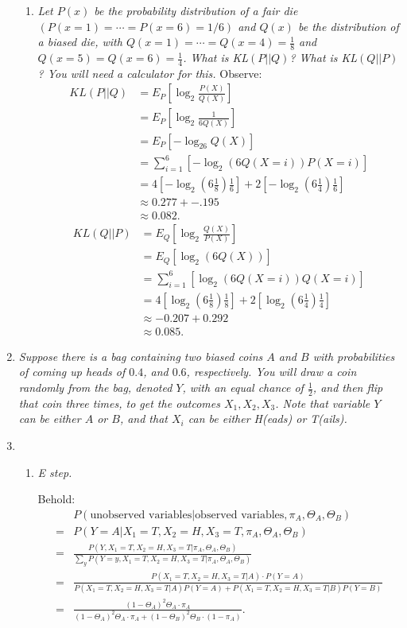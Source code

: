 \documentclass[12pt,oneside,reqno]{amsart}
\theoremstyle{plain}
\theoremstyle{definition}
\theoremstyle{remark}
\newcommand{\bb}{\vspace{3mm}}
\newcommand{\bee}{\begin{equation}\begin{aligned}}
\newcommand{\eee}{\end{aligned}\end{equation}}
\newcommand{\fracc}{\frac}
\begin{document}
\begin{enumerate}[label=\arabic*.]
\begin{enumerate}
\item \textit{Let $P(x)$ be the probability distribution of a fair die $(P(x = 1)=\cdots =P(x = 6) = 1/6)$ and $Q(x)$ be the distribution of a biased die, with $Q(x = 1) = \cdots = Q(x = 4) = \fracc{1}{8}$ and $Q(x = 5) = Q(x = 6) = \fracc{1}{4}$. What is KL$(P||Q)$? What is KL$(Q||P)$? You will need a calculator for this. }
Observe:
\bee
KL(P||Q) &= E_P\left[\log_2\fracc{P(X)}{Q(X)} \right]\\
&= E_P\left[\log_2\fracc{1}{6Q(X)} \right]\\
&= E_P\left[-\log_26Q(X) \right]\\
&= \sum_{i = 1}^6\left[-\log_2(6Q(X = i))P(X = i) \right]\\
&= 4\left[-\log_2(6\fracc{1}{8})\fracc{1}{6} \right] + 2\left[-\log_2(6\fracc{1}{4})\fracc{1}{6} \right]\\
&\approx 0.277 + -.195\\
&\approx 0.082.
\eee
\bee
KL(Q||P) &= E_Q\left[\log_2\fracc{Q(X)}{P(X)} \right]\\
&= E_Q\left[\log_2(6Q(X)) \right]\\
&= \sum_{i = 1}^6\left[\log_2(6Q(X = i))Q(X = i) \right]\\
&= 4\left[\log_2(6\fracc{1}{8})\fracc{1}{8} \right] + 2\left[\log_2(6\fracc{1}{4})\fracc{1}{4} \right]\\
&\approx -0.207 + 0.292\\
&\approx 0.085.
\eee

\end{enumerate}
\bb
\item \textit{Suppose there is a bag containing two biased coins $A$ and $B$ with probabilities of coming up heads of $0.4$, and $0.6$, respectively. You will draw a coin randomly from the bag, denoted $Y$, with an equal chance of $\fracc{1}{2}$, and then flip that coin three times, to get the outcomes $X_1,X_2,X_3$. Note that variable $Y$ can be either $A$ or $B$, and that $X_i$ can be either H(eads) or T(ails). }


\vspace{200mm}

\item 

\begin{enumerate}

\item \textit{E step. }

Behold:
\bee
&P(\text{unobserved variables}|\text{observed variables},\pi_A,\Theta_A,\Theta_B)\\
=& P(Y=A|X_1 = T,X_2 = H,X_3 = T,\pi_A,\Theta_A,\Theta_B)\\
=& \frac{P(Y,X_1 = T,X_2 = H,X_3 = T|\pi_A,\Theta_A,\Theta_B)}{\sum_yP(Y = y,X_1 = T,X_2 = H,X_3 = T|\pi_A,\Theta_A,\Theta_B)}\\
=& \frac{P(X_1 = T,X_2 = H,X_3 = T|A)\cdot P(Y = A)}{P(X_1 = T,X_2 = H,X_3 = T|A)P(Y = A) + P(X_1 = T,X_2 = H,X_3 = T|B)P(Y = B)}\\
=& \frac{(1 - \Theta_A)^2\Theta_A\cdot \pi_A}{(1 - \Theta_A)^2\Theta_A\cdot \pi_A + (1 - \Theta_B)^2\Theta_B\cdot (1 - \pi_A)}. \\
\eee


\end{enumerate}
\end{enumerate}
\end{document}
